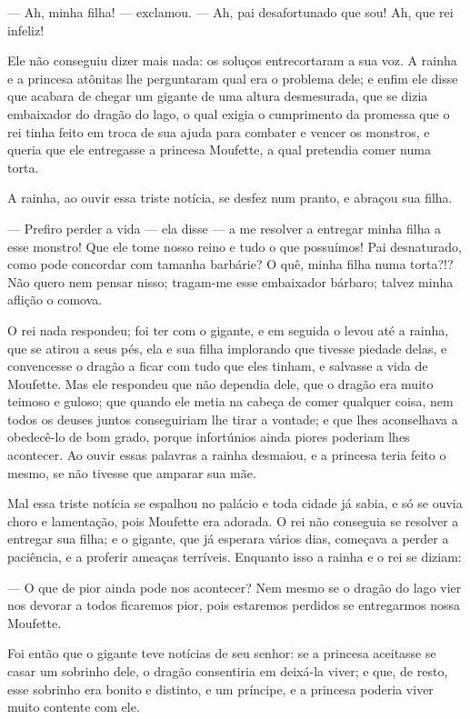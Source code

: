 — Ah, minha filha! — exclamou. — Ah, pai desafortunado que sou! Ah,
que rei infeliz! 

Ele não conseguiu dizer mais nada: os soluços entrecortaram a sua voz.
A rainha e a princesa atônitas lhe perguntaram qual era o problema
dele; e enfim ele disse que acabara de chegar um gigante de uma
altura desmesurada, que se dizia embaixador do dragão do lago, o qual
exigia o cumprimento da promessa que o rei tinha feito em troca de
sua ajuda para combater e vencer os monstros, e queria que ele
entregasse a princesa Moufette, a qual pretendia comer numa torta. 

A rainha, ao ouvir essa triste notícia, se desfez num pranto, e
abraçou sua filha. 

— Prefiro perder a vida — ela disse — a me resolver a entregar minha
filha a esse monstro! Que ele tome nosso reino e tudo o que
possuímos! Pai desnaturado, como pode concordar com tamanha barbárie?
O quê, minha filha numa torta?!? Não quero nem pensar nisso;
tragam-me esse embaixador bárbaro; talvez minha aflição o comova. 

O rei nada respondeu; foi ter com o gigante, e em seguida o levou até
a rainha, que se atirou a seus pés, ela e sua filha implorando que
tivesse piedade delas, e convencesse o dragão a ficar com tudo que
eles tinham, e salvasse a vida de Moufette. Mas ele respondeu que não
dependia dele, que o dragão era muito teimoso e guloso; que quando
ele metia na cabeça de comer qualquer coisa, nem todos os deuses
juntos conseguiriam lhe tirar a vontade; e que lhes aconselhava a
obedecê-lo de bom grado, porque infortúnios ainda piores poderiam
lhes acontecer. Ao ouvir essas palavras a rainha desmaiou, e a
princesa teria feito o mesmo, se não tivesse que amparar sua mãe.

Mal essa triste notícia se espalhou no palácio e toda cidade já sabia,
e só se ouvia choro e lamentação, pois Moufette era adorada. O rei
não conseguia se resolver a entregar sua filha; e o gigante, que já
esperara vários dias, começava a perder a paciência, e a proferir
ameaças terríveis. Enquanto isso a rainha e o rei se diziam:

— O que de pior ainda pode nos acontecer? Nem mesmo se o dragão do
lago vier nos devorar a todos ficaremos pior, pois estaremos perdidos
se entregarmos nossa Moufette. 

Foi então que o gigante teve notícias de seu senhor: se a princesa
aceitasse se casar um sobrinho dele, o dragão consentiria em deixá-la
viver; e que, de resto, esse sobrinho era bonito e distinto, e um
príncipe, e a princesa poderia viver muito contente com ele. 

